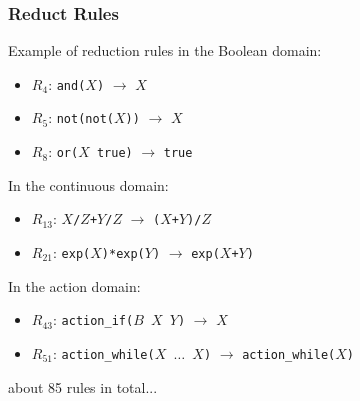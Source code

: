 \documentclass{beamer}
\begin{document}
\frame
{
  \frametitle{Reduct Rules}

  Example of reduction rules in the Boolean domain:
  \begin{itemize}
  \item<+-> $R_4$: {\tt and($X$)} $\rightarrow$ $X$
  \item<+-> $R_5$: {\tt not(not($X$))} $\rightarrow$ $X$
  \item<+-> $R_8$: {\tt or($X$ true)} $\rightarrow$ {\tt true}
  \end{itemize}
  \pause
  In the continuous domain:
  \begin{itemize}
  \item<+-> $R_{13}$: {\tt $X$/$Z$+$Y$/$Z$} $\rightarrow$ {\tt ($X$+$Y$)/$Z$}
  \item<+-> $R_{21}$: {\tt exp($X$)*exp($Y$)} $\rightarrow$ {\tt exp($X$+$Y$)}
  \end{itemize}
  \pause
  In the action domain:
  \begin{itemize}
  \item<+-> $R_{43}$: {\tt action\_if($B$ $X$ $Y$)} $\rightarrow$
    $X$ $\ $ 
  \item<+-> $R_{51}$: {\tt action\_while($X$ $\ldots$ $X$)} $\rightarrow$
    {\tt action\_while($X$)}
  \end{itemize}

  \pause

  \begin{center}
     \alert{about 85 rules in total...}
  \end{center}
}
\end{document}
